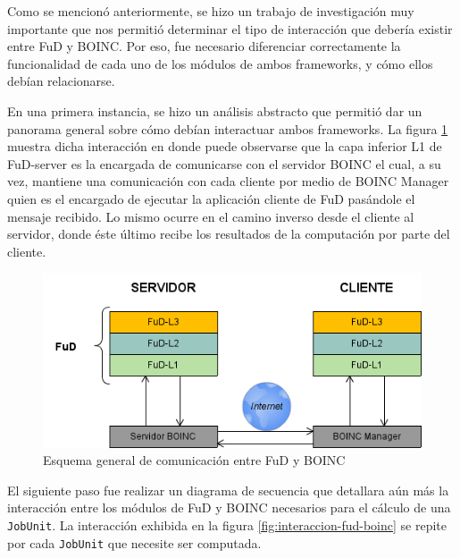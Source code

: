 Como se mencionó anteriormente, se hizo un trabajo de investigación muy importante que nos permitió determinar el tipo de interacción que debería existir entre FuD y BOINC. Por eso, fue necesario diferenciar correctamente la funcionalidad de cada uno de los módulos de ambos frameworks, y cómo ellos debían relacionarse.

En una primera instancia, se hizo un análisis abstracto que permitió dar un panorama general sobre cómo debían interactuar ambos frameworks. La figura \ref{fig:interaccion-fud-boinc-general} muestra dicha interacción en donde puede observarse que la capa inferior L1 de FuD-server es la encargada de comunicarse con el servidor BOINC el cual, a su vez, mantiene una comunicación con cada cliente por medio de BOINC Manager quien es el encargado de ejecutar la aplicación cliente de FuD pasándole el mensaje recibido. Lo mismo ocurre en el camino inverso desde el cliente al servidor, donde éste último recibe los resultados de la computación por parte del cliente. 

\begin{figure}[H]
	\begin{center}
  		\includegraphics[scale=0.7]{images/interaccion-fud-boinc-general.png}
		\caption{Esquema general de comunicación entre FuD y BOINC}
		\label{fig:interaccion-fud-boinc-general}
	\end{center}
\end{figure}

El siguiente paso fue realizar un diagrama de secuencia que detallara aún más la interacción entre los módulos de FuD y BOINC necesarios para el cálculo de una \texttt{JobUnit}. La interacción exhibida en la figura \ref{fig:interaccion-fud-boinc} se repite por cada \texttt{JobUnit} que necesite ser computada.


